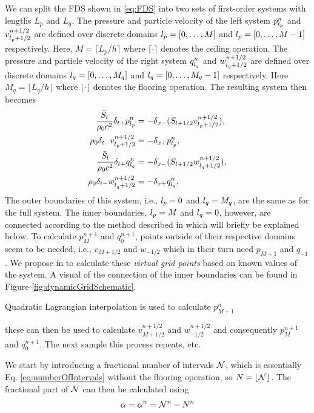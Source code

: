 We can split the FDS shown in \eqref{eq:FDS} into two sets of first-order systems with lengths $L_p$ and $L_q$. The pressure and particle velocity of the left system $p_{l_p}^n$ and $v_{{l_p}+1/2}^{n+1/2}$ are defined over discrete domains ${l_p} = [0, \hdots, M]$ and ${l_p} = [0, \hdots, M-1]$ respectively. Here, $M = \lceil L_p/h\rceil$ where $\lceil \cdot \rceil$ denotes the ceiling operation. The pressure and particle velocity of the right system $q_{l_q}^n$ and $w_{{l_q}+1/2}^{n+1/2}$ are defined over discrete domains ${l_q} = [0, \hdots, M_q]$ and ${l_q} = [0, \hdots, M_q-1]$ respectively. Here $M_q = \lfloor L_q/h\rfloor$ where $\lfloor \cdot \rfloor$ denotes the flooring operation. The resulting system then becomes
\begin{subequations}
    \begin{align}
        \frac{\bar S_{l}}{\rho_0 c^2}\delta_{t+}p_{l_p}^n &= -\delta_{x-}(S_{{l}+1/2}v_{{l_p}+1/2}^{n+1/2}),\label{eq:discPressureP}\\
        \rho_0 \delta_{t-}v_{{l_p}+1/2}^{n+1/2}&=-\delta_{x+}p_{l_p}^n,\label{eq:discVelocityV}\\
        \frac{\bar S_{l}}{\rho_0 c^2}\delta_{t+}q_{l_q}^n &= -\delta_{x-}(S_{{l}+1/2}w_{{l_q}+1/2}^{n+1/2}),\label{eq:discPressureP}\\
        \rho_0 \delta_{t-}w_{{l_q}+1/2}^{n+1/2}&=-\delta_{x+}q_{l_q}^n,\label{eq:discVelocityV}
    \end{align}
\end{subequations}
The outer boundaries of this system, i.e., ${l_p} = 0$ and ${l_q} = M_q$, are the same as for the full system. The inner boundaries, ${l_p} = M$ and ${l_q} = 0$, however, are connected according to the method described in \cite{Willemsen2021} which will briefly be explained below. To calculate $p_M^{n+1}$ and $q_0^{n+1}$, points outside of their respective domains seem to be needed, i.e., $v_{M+1/2}$ and $w_{-1/2}$ which in their turn need $p_{M+1}$ and $q_{-1}$. We propose in \cite{Willemsen2021} to calculate these \textit{virtual grid points} based on known values of the system. A visual of the connection of the inner boundaries can be found in Figure \ref{fig:dynamicGridSchematic}.

Quadratic Lagrangian interpolation is used to calculate $p_{M+1}^n$


these can then be used to calculate $v_{M+1/2}^{n+1/2}$ and $w_{-1/2}^{n+1/2}$ and consequently $p_M^{n+1}$ and $q_0^{n+1}$. The next sample this process repeats, etc. 

We start by introducing a fractional number of intervals $\mathcal{N}$, which is essentially Eq. \eqref{eq:numberOfIntervals} without the flooring operation, so $N = \lfloor \mathcal{N} \rfloor$. The fractional part of $\mathcal{N}$ can then be calculated using
\begin{equation}
    \alpha = \alpha^n = \mathcal{N}^n - N^n
\end{equation}






